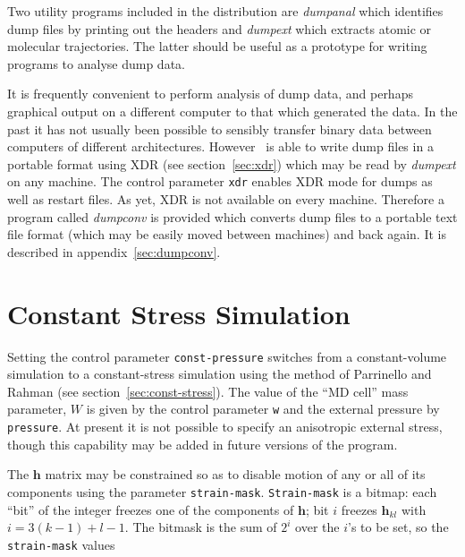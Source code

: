 Two utility programs included in the distribution are {\em
dumpanal\/} which identifies dump files by printing out the headers
and {\em dumpext\/} which extracts atomic or molecular
trajectories.  The latter should be useful as a prototype for writing
programs to analyse dump data.

It is frequently convenient to perform analysis of dump data, and
perhaps graphical output on a different computer to that which
generated the data.  In the past it has not usually been possible to
sensibly transfer binary data between computers of different
architectures.  However \moldy\ is able to write dump files in a
portable format using XDR (see section~\ref{sec:xdr}) which may be
read by {\em dumpext\/} on any machine.  The control parameter
\verb'xdr' enables XDR mode for dumps as well as restart files.
As yet, XDR is not available on every machine.  Therefore a program
called {\em dumpconv\/} is provided which converts dump files to a
portable text file format (which may be easily moved between machines)
and back again. It is described in appendix~\ref{sec:dumpconv}.


\section{Constant Stress Simulation}%

Setting  the control parameter   \verb'const-pressure' switches from a
constant-volume  simulation to a con\-stant-stress  simulation using the
method     of    Parrinello     and    Rahman\cite{parrinello:81}   (see
section~\ref{sec:const-stress}).   The value of  the  ``MD cell'' mass
parameter,  $W$  is given by the control  parameter \verb'w'  and  the
external pressure by \verb'pressure'. At present it is not possible to
specify an anisotropic external stress, though this  capability may be
added in future versions of the program.

\label{sec:cp-constraints}
The $\bm{h}$ matrix may be constrained so as to disable motion of any
or all of its components using the parameter \verb'strain-mask'. 
\verb'Strain-mask' is a bitmap: each ``bit'' of the integer
freezes one of the components of $\bm{h}$;
bit $i$ freezes $ \bm{h}_{kl}$ with 
$ i = 3 (k\!-\!1)\! +\! l\! -\!1$.
The bitmask is the sum of $2^i$ over the $i$'s to be set, so the
\verb`strain-mask` values

